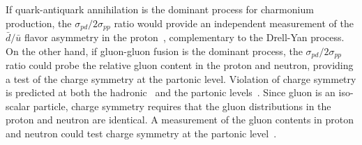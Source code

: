 \documentclass[../main.tex]{subfiles}
\begin{document}
If quark-antiquark annihilation is the dominant process for charmonium
production, the $\sigma_{pd}/2\sigma_{pp}$ ratio would provide an
independent measurement of the $\bar{d}/ \bar{u}$ flavor asymmetry in the
proton~\cite{peng1995}, complementary to the Drell-Yan process.
On the other hand, if gluon-gluon fusion is the dominant process, the
$\sigma_{pd}/2\sigma_{pp}$ ratio could probe the relative gluon content
in the proton and neutron, providing a test of the charge symmetry at the partonic level. 
Violation of charge symmetry is predicted at both the hadronic~\cite{stephenson2003,opper2003} 
and the partonic levels~\cite{londergan2010}. Since gluon is an iso-scalar particle,
charge symmetry requires that the gluon distributions in the proton and neutron
are identical. A measurement of the gluon contents in proton and neutron could test charge symmetry at
the partonic level~\cite{piller1996,zhu2008,lansberg2012}.
\end{document}
